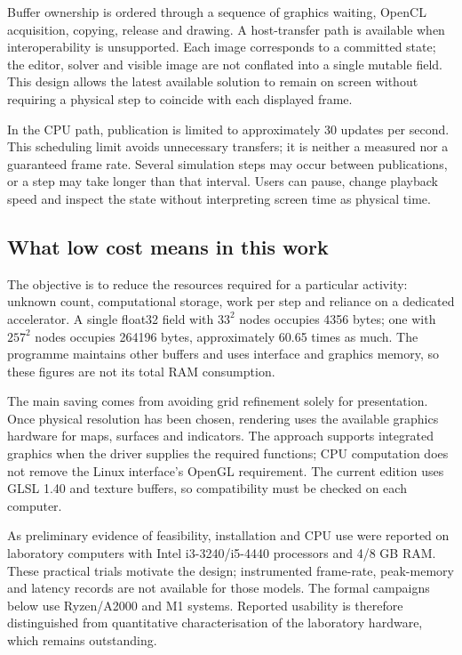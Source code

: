 \documentclass[11pt,a4paper]{article}
\begin{document}
Buffer ownership is ordered through a sequence of graphics waiting, OpenCL acquisition, copying, release and drawing. A host-transfer path is available when interoperability is unsupported. Each image corresponds to a committed state; the editor, solver and visible image are not conflated into a single mutable field. This design allows the latest available solution to remain on screen without requiring a physical step to coincide with each displayed frame.

In the CPU path, publication is limited to approximately 30 updates per second. This scheduling limit avoids unnecessary transfers; it is neither a measured nor a guaranteed frame rate. Several simulation steps may occur between publications, or a step may take longer than that interval. Users can pause, change playback speed and inspect the state without interpreting screen time as physical time.

\subsection{What low cost means in this work}
The objective is to reduce the resources required for a particular activity: unknown count, computational storage, work per step and reliance on a dedicated accelerator. A single float32 field with $33^2$ nodes occupies 4356 bytes; one with $257^2$ nodes occupies 264196 bytes, approximately 60.65 times as much. The programme maintains other buffers and uses interface and graphics memory, so these figures are not its total RAM consumption.

The main saving comes from avoiding grid refinement solely for presentation. Once physical resolution has been chosen, rendering uses the available graphics hardware for maps, surfaces and indicators. The approach supports integrated graphics when the driver supplies the required functions; CPU computation does not remove the Linux interface's OpenGL requirement. The current edition uses GLSL 1.40 and texture buffers, so compatibility must be checked on each computer.

As preliminary evidence of feasibility, installation and CPU use were reported on laboratory computers with Intel i3-3240/i5-4440 processors and 4/8 GB RAM. These practical trials motivate the design; instrumented frame-rate, peak-memory and latency records are not available for those models. The formal campaigns below use Ryzen/A2000 and M1 systems. Reported usability is therefore distinguished from quantitative characterisation of the laboratory hardware, which remains outstanding.
\end{document}
